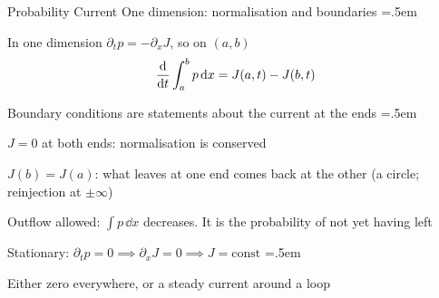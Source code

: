 \documentclass[xcolor={dvipsnames},t]{beamer}
\let\olditemize=\itemize
\let\endolditemize=\enditemize
\renewenvironment{itemize}{\olditemize \itemsep=.5em }{\endolditemize}
\begin{document}
\begin{frame}{Probability Current}
    \alert{One dimension: normalisation and boundaries}
    \begin{itemize}
        \item<2-> In one dimension $\partial_tp = -\partial_xJ$, so on $(a,b)$
        \[ \dv{t}\int_a^b p\,\dd x = J(a,t) - J(b,t) \]
        \item<3-> Boundary conditions are statements about the current at the ends
        \begin{itemize}
            \item<4-> $J=0$ at both ends: normalisation is conserved
            \item<5-> $J(b)=J(a)$: what leaves at one end comes back at the other (a circle; reinjection at $\pm\infty$)
            \item<6-> Outflow allowed: $\int p\,\dd x$ decreases. It is the probability of not yet having left
        \end{itemize}
        \item<7-> Stationary: $\partial_tp=0\implies\partial_xJ=0\implies J=\text{const}$
        \begin{itemize}
            \item<8-> Either zero everywhere, or a steady current around a loop
        \end{itemize}
    \end{itemize}
\end{frame}
\end{document}
